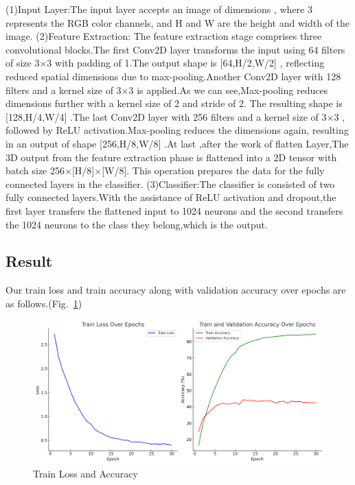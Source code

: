 \documentclass{mcmthesis}
\begin{document}
(1)Input Layer:The input layer accepts an image of dimensions , where 3 represents the RGB color channels, and H and W are the height and width of the image. (2)Feature Extraction: The feature extraction stage comprises three convolutional blocks.The first Conv2D layer transforms the input using 64 filters of size 3$\times$3 with padding of 1.The output shape is [64,H/2,W/2] , reflecting reduced spatial dimensions due to max-pooling.Another Conv2D layer with 128 filters and a kernel size of 3$\times$3  is applied.As we can see,Max-pooling reduces dimensions further with a kernel size of 2 and stride of 2.
The resulting shape is [128,H/4,W/4] .The last Conv2D layer with 256 filters and a kernel size of 3$\times$3 , followed by ReLU activation.Max-pooling reduces the dimensions again, resulting in an output of shape [256,H/8,W/8] .At last ,after the work of flatten Layer,The 3D output from the feature extraction phase is flattened into a 2D tensor with batch size 256$\times$[H/8]$\times$[W/8]. This operation prepares the data for the fully connected layers in the classifier.
(3)Classifier:The classifier is consisted of two fully connected layers.With the assistance of ReLU activation and dropout,the first layer transfers the flattened input to 1024 neurons and the second transfers the 1024 neurons to the class they belong,which is the output.

\subsection{Result}
Our train loss and train accuracy along with validation accuracy over epochs are as follows.(Fig.~\ref{fig:Train_Loss_and_Accuracy})

\begin{figure}[htbp]
\centering
\includegraphics[width =\textwidth]{pics/Train_Loss_and_Accuracy.png}
\caption{Train Loss and Accuracy}
\label{fig:Train_Loss_and_Accuracy}
\end{figure}
\end{document}

